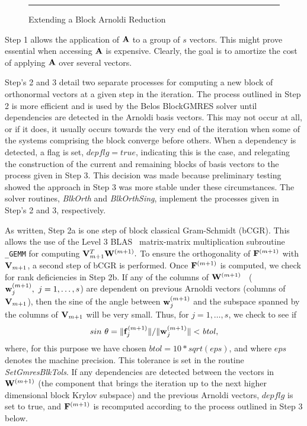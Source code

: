 \documentclass{article}
\newcommand{\bA}{{\bf A}}
\newcommand{\bF}{{\bf F}}
\newcommand{\bV}{{\bf V}}
\newcommand{\bW}{{\bf W}}
\newcommand{\bw}{{\bf w}}
\newcommand{\dm}{\begin{displaymath}}
\newcommand{\edm}{\end{displaymath}}
\begin{document}
{\begin{figure}
\begin{description}
\begin{enumerate}
\begin{enumerate}
\end{enumerate}

\end{enumerate}
\end{description}
\vspace{.1in} \hrule \caption{Extending a Block Arnoldi Reduction}
\label{fig:blk_arn_red_alg}
\end{figure}
}


Step 1 allows the application of $\bA$ to a group of $s$ vectors.
This might prove essential when accessing $\bA$ is expensive.
Clearly, the goal is to amortize the cost of applying $\bA$ over
several vectors.

Step's 2 and 3 detail two separate processes for computing a new
block of orthonormal vectors at a given step in the iteration. The
process outlined in Step 2 is more efficient and is used by the
Belos BlockGMRES solver until dependencies are detected in the
Arnoldi basis vectors. This may not occur at all, or if it does,
it usually occurs towards the very end of the iteration when some
of the systems comprising the block converge before others. When a
dependency is detected, a flag is set, $depflg = true$, indicating
this is the case, and relegating the construction of the current
and remaining blocks of basis vectors to the process given in Step
3. This decision was made because preliminary testing showed the
approach in Step 3 was more stable under these circumstances. The
solver routines, {\it BlkOrth} and {\it BlkOrthSing}, implement
the processes given in Step's 2 and 3, respectively.

As written, Step 2a is one step of block classical Gram-Schmidt
(bCGR). This allows the use of the Level 3 {\small
BLAS}~\cite{dddh:90} matrix-matrix multiplication subroutine {\tt
\_GEMM} for computing $\bV_{m+1}^T \bW^{(m+1)}.$ To ensure the
orthogonality of $\bF^{(m+1)}$ with $\bV_{m+1}$, a second step of
bCGR is performed. Once $\bF^{(m+1)}$ is computed, we check for
rank deficiencies in Step 2b. If any of the columns of
$\bW^{(m+1)}$~ ($\bw_j^{(m+1)},~j=1,\ldots,s$) are dependent on
previous Arnoldi vectors (columns of $\bV_{m+1}$), then the sine
of the angle between $\bw_j^{(m+1)}$ and the subspace spanned by
the columns of $\bV_{m+1}$ will be very small. Thus, for $j =
1,\ldots,s$, we check to see if
 \dm
 sin~\theta = \| {\bf f}_j^{(m+1)} \| / \| \bw_j^{(m+1)} \| < {\it btol},
 \edm
where, for this purpose we have chosen $btol = 10 * sqrt(eps)$,
and where $eps$ denotes the machine precision. This tolerance is
set in the routine {\it SetGmresBlkTols}. If any dependencies are
detected between the vectors in $\bW^{(m+1)}$ (the component that
brings the iteration up to the next higher dimensional block
Krylov subspace) and the previous Arnoldi vectors, $depflg$ is set
to true, and $\bF^{(m+1)}$ is recomputed according to the process
outlined in Step 3 below.
\end{document}
